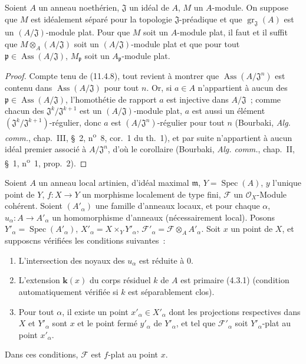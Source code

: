 \begin{corollary}[11.4.10]
\label{IV.11.4.10-fr}
Soient $A$ un anneau noethérien, $\mathfrak J$ un idéal de $A$, $M$ un
$A$-module. On suppose que $M$ est idéalement séparé pour la topologie
$\mathfrak J$-préadique et que $\operatorname{gr}_{\mathfrak J}(A)$ est un
$(A/\mathfrak J)$-module plat. Pour que $M$ soit un $A$-module plat, il faut et
il suffit que $M\otimes_A(A/\mathfrak J)$ soit un $(A/\mathfrak J)$-module plat
et que pour tout $\mathfrak p\in\operatorname{Ass}(A/\mathfrak J)$,
$M_{\mathfrak p}$ soit un $A_{\mathfrak p}$-module plat.
\end{corollary}

\begin{proof}
Compte tenu de (11.4.8), tout revient à montrer que
$\operatorname{Ass}(A/\mathfrak J^n)$ est contenu dans
$\operatorname{Ass}(A/\mathfrak J)$ pour tout $n$. Or, si $a\in A$ n'appartient
à aucun des $\mathfrak p\in\operatorname{Ass}(A/\mathfrak J)$, l'homothétie de
rapport $a$ est injective dans $A/\mathfrak J$~; comme chacun des
$\mathfrak J^k/\mathfrak J^{k+1}$ est un $(A/\mathfrak J)$-module plat, $a$ est
aussi un élément $(\mathfrak J^k/\mathfrak J^{k+1})$-régulier, donc $a$ est
$(A/\mathfrak J^n)$-régulier pour tout $n$ (Bourbaki, \emph{Alg. comm.},
chap.~III, \S~2, n\textsuperscript{o}~8, cor.~1 du th.~1), et par suite n'appartient à
aucun idéal premier associé à $A/\mathfrak J^n$, d'où le corollaire (Bourbaki,
\emph{Alg. comm.}, chap.~II, \S~1, n\textsuperscript{o}~1, prop.~2).
\end{proof}

\begin{proposition}[11.4.11]
\label{IV.11.4.11-fr}
Soient $A$ un anneau local artinien, d'idéal maximal $\mathfrak m$,
$Y=\operatorname{Spec}(A)$, $y$ l'unique point de $Y$, $f:X\to Y$ un morphisme
localement de type fini, $\mathcal F$ un $\mathcal O_X$-Module cohérent. Soient
$(A'_\alpha)$ une famille d'anneaux locaux, et pour chaque $\alpha$,
$u_\alpha:A\to A'_\alpha$ un homomorphisme d'anneaux (nécessairement local).
Posons $Y'_\alpha=\operatorname{Spec}(A'_\alpha)$,
$X'_\alpha=X\times_Y Y'_\alpha$,
$\mathcal F'_\alpha=\mathcal F\otimes_A A'_\alpha$. Soit $x$ un point de $X$,
et supposcns vérifiées les conditions suivantes~:
\begin{enumerate}[label=\textup{(\roman*)}]
  \item L'intersection des noyaux des $u_\alpha$ est réduite à $0$.
  \item L'extension $\boldsymbol{k}(x)$ du corps résiduel $k$ de $A$ est primaire \textup{(4.3.1)}
  (condition automatiquement vérifiée si $k$ est séparablement clos).
  \item Pour tout $\alpha$, il existe un point $x'_\alpha\in X'_\alpha$ dont
  les projections respectives dans $X$ et $Y'_\alpha$ sont $x$ et le point
  fermé $y'_\alpha$ de $Y'_\alpha$, et tel que $\mathcal F'_\alpha$ soit
  $Y'_\alpha$-plat au point $x'_\alpha$.
\end{enumerate}

Dans ces conditions, $\mathcal F$ est $f$-plat au point $x$.
\end{proposition}

